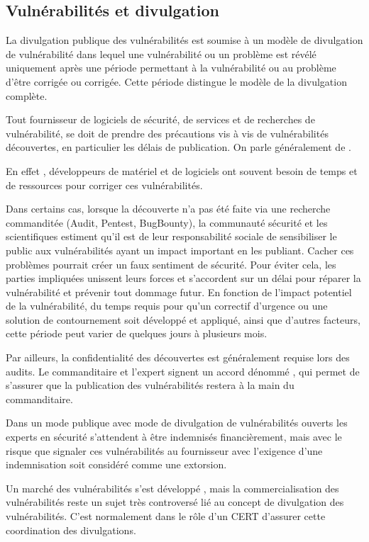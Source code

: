 \subsection{Vulnérabilités et divulgation}

 La divulgation publique des vulnérabilités  est soumise à un modèle de divulgation de vulnérabilité dans lequel une vulnérabilité ou un problème est révélé uniquement après une période permettant à la vulnérabilité ou au problème d'être corrigée ou corrigée. Cette période distingue le modèle de la divulgation complète.
 
Tout fournisseur de logiciels de sécurité, de services et de recherches de vulnérabilité, se doit de prendre des précautions vis à vis de vulnérabilités découvertes, en particulier les délais de publication. On parle généralement de .

En effet , développeurs de matériel et de logiciels ont souvent besoin de temps et de ressources pour corriger ces vulnérabilités. 

Dans certains cas, lorsque la découverte n'a pas été faite via une recherche commanditée (Audit, Pentest, BugBounty), la communauté sécurité et les scientifiques  estiment qu’il est de leur responsabilité sociale de sensibiliser le public aux vulnérabilités ayant un impact important en les publiant. Cacher ces problèmes pourrait créer un faux sentiment de sécurité. Pour éviter cela, les parties impliquées unissent leurs forces et s’accordent sur un délai pour réparer la vulnérabilité et prévenir tout dommage futur. En fonction de l'impact potentiel de la vulnérabilité, du temps requis pour qu'un correctif d'urgence ou une solution de contournement soit développé et appliqué, ainsi que d'autres facteurs, cette période peut varier de quelques jours à plusieurs mois. 

Par ailleurs, la confidentialité des découvertes est généralement requise lors des audits. Le commanditaire et l'expert signent un accord dénommé , qui permet de s'assurer que la publication des vulnérabilités restera à la main du commanditaire.

Dans un mode publique avec mode de divulgation de vulnérabilités ouverts les experts en sécurité  s'attendent à être indemnisés financièrement, mais avec le risque que signaler ces vulnérabilités au fournisseur avec l'exigence d'une indemnisation soit considéré comme une extorsion. 

Un marché des vulnérabilités s'est développé , mais la commercialisation des vulnérabilités reste un sujet très controversé lié au concept de divulgation des vulnérabilités.   C'est normalement dans le rôle d'un CERT d'assurer cette coordination des divulgations.


